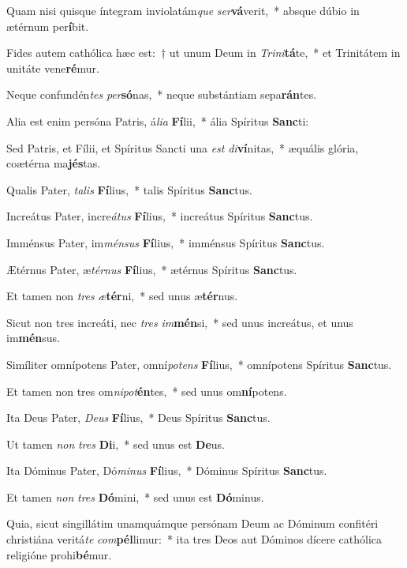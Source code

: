 \item Quam nisi quisque íntegram inviolatám\textit{que} \textit{ser}\textbf{vá}verit,~* absque dúbio in ætérnum per\textbf{í}bit.
\item Fides autem cathólica hæc est:~† ut unum Deum in \textit{Tri}\textit{ni}\textbf{tá}te,~* et Trinitátem in unitáte vene\textbf{ré}mur.
\item Neque confundén\textit{tes} \textit{per}\textbf{só}nas,~* neque substántiam sepa\textbf{rán}tes.
\item Alia est enim persóna Patris, á\textit{li}\textit{a} \textbf{Fí}lii,~* ália Spíritus \textbf{Sanc}ti:
\item Sed Patris, et Fílii, et Spíritus Sancti una \textit{est} \textit{di}\textbf{ví}nitas,~* æquális glória, coætérna ma\textbf{jés}tas.
\item Qualis Pater, \textit{ta}\textit{lis} \textbf{Fí}lius,~* talis Spíritus \textbf{Sanc}tus.
\item Increátus Pater, incre\textit{á}\textit{tus} \textbf{Fí}lius,~* increátus Spíritus \textbf{Sanc}tus.
\item Imménsus Pater, im\textit{mén}\textit{sus} \textbf{Fí}lius,~* imménsus Spíritus \textbf{Sanc}tus.
\item Ætérnus Pater, æ\textit{tér}\textit{nus} \textbf{Fí}lius,~* ætérnus Spíritus \textbf{Sanc}tus.
\item Et tamen non \textit{tres} \textit{æ}\textbf{tér}ni,~* sed unus æ\textbf{tér}nus.
\item Sicut non tres increáti, nec \textit{tres} \textit{im}\textbf{mén}si,~* sed unus increátus, et unus im\textbf{mén}sus.
\item Simíliter omnípotens Pater, omní\textit{pot}\textit{ens} \textbf{Fí}lius,~* omnípotens Spíritus \textbf{Sanc}tus.
\item Et tamen non tres om\textit{ni}\textit{pot}\textbf{én}tes,~* sed unus om\textbf{ní}potens.
\item Ita Deus Pater, \textit{De}\textit{us} \textbf{Fí}lius,~* Deus Spíritus \textbf{Sanc}tus.
\item Ut tamen \textit{non} \textit{tres} \textbf{Di}i,~* sed unus est \textbf{De}us.
\item Ita Dóminus Pater, Dó\textit{mi}\textit{nus} \textbf{Fí}lius,~* Dóminus Spíritus \textbf{Sanc}tus.
\item Et tamen \textit{non} \textit{tres} \textbf{Dó}mini,~* sed unus est \textbf{Dó}minus.
\item Quia, sicut singillátim unamquámque persónam Deum ac Dóminum confitéri christiána veritá\textit{te} \textit{com}\textbf{pél}limur:~* ita tres Deos aut Dóminos dícere cathólica religióne prohi\textbf{bé}mur.
